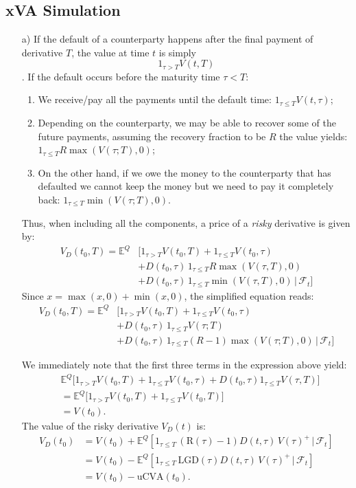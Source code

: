 \documentclass{article}
\begin{document}
\subsection{xVA Simulation}
\begin{itemize}
    \item[a)] If the default of a counterparty happens after the final payment of derivative $T$, the value at time $t$ is simply $$1_{\tau > T}V(t,T)$$.
 If the default occurs before the maturity time $\tau < T$:
\begin{enumerate}
    \item We receive/pay all the payments until the default time: $1_{\tau \leq T}V(t, \tau)$;
    \item Depending on the counterparty, we may be able to recover some of the future payments, assuming the recovery fraction to be $R$ the value yields: $1_{\tau \leq T}R \max(V(\tau;T), 0)$;
    \item On the other hand, if we owe the money to the counterparty that has defaulted we cannot keep the money but we need to pay it completely back: $1_{\tau \leq T} \min(V(\tau;T), 0)$.
\end{enumerate}
Thus, when including all the components, a price of a \textit{risky} derivative is given by:
\begin{align*}
V_D(t_0, T) = \mathbb{E}^Q& \big[ 1_{\tau > T}V(t_0,T) +
1_{\tau \leq T}V(t_0, \tau) \\
&+ D(t_0, \tau) \, 1_{\tau \leq T}R \max(V(\tau,T), 0) \\
&+ D(t_0, \tau) \, 1_{\tau \leq T} \min(V(\tau, T), 0) \,|\, \mathcal{F}_t \big]
\end{align*}
Since \( x = \max(x, 0) + \min(x, 0) \), the simplified equation reads:
\begin{align*}
V_D(t_0, T) = \mathbb{E}^Q& \big[ 1_{\tau > T}V(t_0,T) +
1_{\tau \leq T}V(t_0, \tau) \\
&+ D(t_0, \tau) \, 1_{\tau \leq T} V(\tau;T)\\
&+ D(t_0, \tau) \, 1_{\tau \leq T}(R-1) \max(V(\tau;T), 0) \,|\, \mathcal{F}_t \big]
\end{align*}

We immediately note that the first three terms in the expression above yield:
\begin{align*}
    &\mathbb{E}^Q \big[ 1_{\tau > T}V(t_0,T) +
1_{\tau \leq T}V(t_0, \tau) + D(t_0, \tau)1_{\tau \leq T} V(\tau,T) \big] \\
    &= \mathbb{E}^Q \big[ 1_{\tau > T}V(t_0,T) +
1_{\tau \leq T}V(t_0, T) \big] \\
    &= V(t_0).
\end{align*}
The value of the risky derivative $V_D(t)$ is:
\begin{align*}
    V_D(t_0) &=  V(t_0) + \mathbb{E}^Q \left[1_{ \tau \leq T} \, (\text{R}(\tau) -1) D(t, \tau) \,  V(\tau)^+ \,|\, \mathcal{F}_t \right] \\
    &= V(t_0) - \mathbb{E}^Q \left[1_{ \tau \leq T} \, \text{LGD}(\tau) D(t, \tau) \,  V(\tau)^+ \,|\, \mathcal{F}_t \right]  \\
    &= V(t_0) - \text{uCVA}(t_0).
\end{align*}


\end{itemize}
\end{document}
